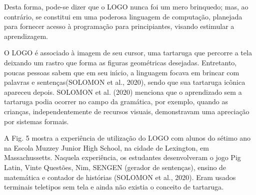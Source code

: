 \documentclass[
12pt,		%
openright,	%
twoside,  %
a4paper,			%
chapter=TITLE,		%
english,			%
french,				%
spanish,			%
brazil				%
]{USPSC-classe/USPSC}
\begin{document}
Desta forma, pode-se dizer que o LOGO nunca foi um mero brinquedo; mas, ao contr\'ario, se constitui em uma poderosa linguagem de computa\c{c}\~ao, planejada para fornecer acesso \`a programa\c{c}\~ao para principiantes, visando estimular a aprendizagem.

















O LOGO \'e associado \`a imagem de seu cursor, uma tartaruga que percorre a tela deixando um rastro que forma as figuras geom\'etricas desejadas. Entretanto, poucas pessoas sabem que em seu in\'{\i}cio, a linguagem \textquotedbl focava em brincar com palavras e senten\c{c}as\textquotedbl  (SOLOMON et al., 2020), sendo que sua tartaruga \textquotedbl  ic\^onica \textquotedbl  apareceu depois.  SOLOMON et al. (2020) menciona que o aprendizado sem a tartaruga podia ocorrer no campo da gram\'atica, por exemplo, quando as crian\c{c}as, independentemente de recursos visuais, demonstravam uma aprecia\c{c}\~ao por sistemas formais.

















A Fig. 5 mostra a experi\^encia de utiliza\c{c}\~ao do LOGO com alunos do s\'etimo ano na Escola Muzzey Junior High School, na cidade de Lexington, em Massachussetts. Naquela experi\^encia, os estudantes desenvolveram o jogo Pig Latin, Vinte Quest\~oes, Nim, SENGEN (gerador de senten\c{c}as), ensino de matem\'atica e contador de hist\'orias  (SOLOMON et al., 2020). Eram usados terminais teletipos sem tela e ainda n\~ao existia o conceito de tartaruga.
\end{document}
